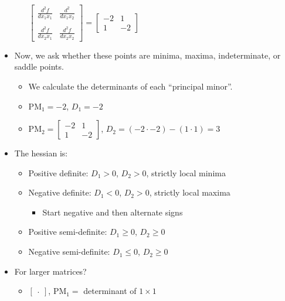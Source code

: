 \begin{itemize}
\begin{itemize}
        \vspace{1em}
        $\begin{bmatrix}
            \frac{d^2f}{dx_1x_1} & \frac{d^2}{dx_1x_2} \\ \\
            \frac{d^2f}{dx_2x_1} & \frac{d^2f}{dx_2x_2}
        \end{bmatrix}
        = 
        \begin{bmatrix}
            -2 & 1 \\
            1 & -2
        \end{bmatrix}
        $
        \vspace{1em}
    \end{itemize}
    \item Now, we ask whether these points are minima, maxima, indeterminate, or saddle points. 
    \begin{itemize}
        \item We calculate the determinants of each ``principal minor''.
        \item PM$_1 = -2$, $D_1 = -2$
        \item PM$_2 = \begin{bmatrix}
            -2 & 1 \\
            1 & -2
        \end{bmatrix}$, $D_2 = (-2 \cdot -2) - (1 \cdot 1) = 3$
    \end{itemize}
    \item The hessian is:
    \begin{itemize}
        \item Positive definite: $D_1 > 0$, $D_2 > 0$, strictly local minima
        \item Negative definite: $D_1 < 0$, $D_2 > 0$, strictly local maxima
        \begin{itemize}
            \item Start negative and then alternate signs
        \end{itemize} 
        \item Positive semi-definite: $D_1 \geq 0$, $D_2 \geq 0$
        \item Negative semi-definite: $D_1 \leq 0$, $D_2 \geq 0$
    \end{itemize}
    \item For larger matrices?
    \begin{itemize}
        \item $\begin{bmatrix}
            .
        \end{bmatrix}$, PM$_1 = $ determinant of $1 \times 1$

\end{itemize}
\end{itemize}
